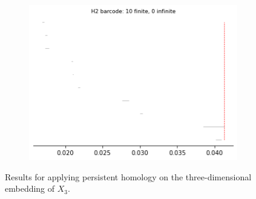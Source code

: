 \begin{figure}[H]
\begin{subfigure}[b]{0.24\textwidth}
\includegraphics[width=\textwidth]{figures/X3_H2_barcode.png}
 \caption{}
\end{subfigure}
\caption{Results for applying persistent homology on the three-dimensional embedding of $X_3$.}
\end{figure}

